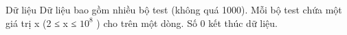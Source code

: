 Dữ liệu
Dữ liệu bao gồm nhiều bộ test (không quá 1000). Mỗi bộ test chứa một giá trị x (2 ≤ x ≤ $10^{8}$   ) cho trên một dòng. Số 0 kết thúc dữ liệu.